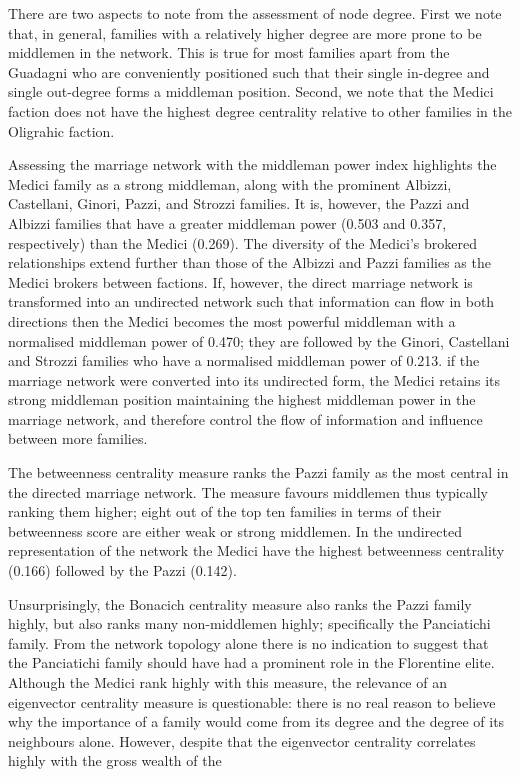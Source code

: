 There are two aspects to note from the assessment of node degree. First we note that, in general, families with a relatively higher degree are more prone to be middlemen in the network. This is true for most families apart from the Guadagni who are conveniently positioned such that their single in-degree and single out-degree forms a middleman position. Second, we note that the Medici faction does not have the highest degree centrality relative to other families in the Oligrahic faction.

Assessing the marriage network with the middleman power index highlights the Medici family as a strong middleman, along with the prominent Albizzi, Castellani, Ginori, Pazzi, and Strozzi families. It is, however, the Pazzi and Albizzi families that have a greater middleman power (0.503 and 0.357, respectively) than the Medici (0.269). The diversity of the Medici's brokered relationships extend further than those of the Albizzi and Pazzi families as the Medici brokers between factions. If, however, the direct marriage network is transformed into an undirected network such that information can flow in both directions then the Medici becomes the most powerful middleman with a normalised middleman power of 0.470; they are followed by the Ginori, Castellani and Strozzi families who have a normalised middleman power of 0.213. if the marriage network were converted into its undirected form, the Medici retains its strong middleman position maintaining the highest middleman power in the marriage network, and therefore control the flow of information and influence between more families.

The betweenness centrality measure ranks the Pazzi family as the most central in the directed marriage network. The measure favours middlemen thus typically ranking them higher; eight out of the top ten families in terms of their betweenness score are either weak or strong middlemen. In the undirected representation of the network the Medici have the highest betweenness centrality (0.166) followed by the Pazzi (0.142).

Unsurprisingly, the Bonacich centrality measure also ranks the Pazzi family highly, but also ranks many non-middlemen highly; specifically the Panciatichi family. From the network topology alone there is no indication to suggest that the Panciatichi family should have had a prominent role in the Florentine elite. Although the Medici rank highly with this measure, the relevance of an eigenvector centrality measure is questionable: there is no real reason to believe why the importance of a family would come from its degree and the degree of its neighbours alone. However, despite that the eigenvector centrality correlates highly with the gross wealth of the 

